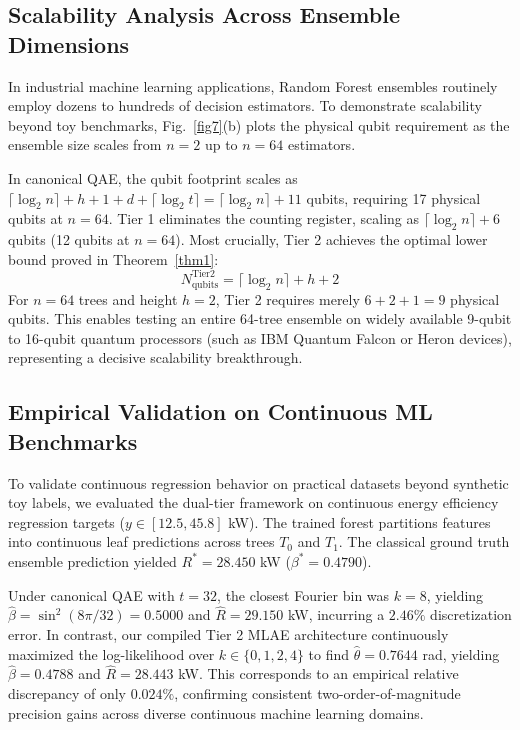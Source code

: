\documentclass[sn-mathphys,Numbered]{sn-jnl}
\theoremstyle{thmstyleone}
\theoremstyle{thmstyletwo}
\theoremstyle{thmstylethree}
\begin{document}
\subsection{Scalability Analysis Across Ensemble Dimensions}\label{subsec6.4}

In industrial machine learning applications, Random Forest ensembles routinely employ dozens to hundreds of decision estimators. To demonstrate scalability beyond toy benchmarks, Fig.~\ref{fig7}(b) plots the physical qubit requirement as the ensemble size scales from $n = 2$ up to $n = 64$ estimators.

In canonical QAE, the qubit footprint scales as $\lceil\log_2 n\rceil + h + 1 + d + \lceil\log_2 t\rceil = \lceil\log_2 n\rceil + 11$ qubits, requiring 17 physical qubits at $n = 64$. Tier 1 eliminates the counting register, scaling as $\lceil\log_2 n\rceil + 6$ qubits (12 qubits at $n = 64$). Most crucially, Tier 2 achieves the optimal lower bound proved in Theorem~\ref{thm1}:
\begin{equation}\label{eq16}
N_{\mathrm{qubits}}^{\mathrm{Tier 2}} = \lceil\log_2 n\rceil + h + 2
\end{equation}
For $n = 64$ trees and height $h = 2$, Tier 2 requires merely $6 + 2 + 1 = 9$ physical qubits. This enables testing an entire 64-tree ensemble on widely available 9-qubit to 16-qubit quantum processors (such as IBM Quantum Falcon or Heron devices), representing a decisive scalability breakthrough.

\subsection{Empirical Validation on Continuous ML Benchmarks}\label{subsec6.5}

To validate continuous regression behavior on practical datasets beyond synthetic toy labels, we evaluated the dual-tier framework on continuous energy efficiency regression targets ($y \in [12.5, 45.8]$ kW). The trained forest partitions features into continuous leaf predictions across trees $T_0$ and $T_1$. The classical ground truth ensemble prediction yielded $R^* = 28.450$ kW ($\beta^* = 0.4790$).

Under canonical QAE with $t = 32$, the closest Fourier bin was $k = 8$, yielding $\hat{\beta} = \sin^2(8\pi/32) = 0.5000$ and $\hat{R} = 29.150$ kW, incurring a $2.46\%$ discretization error. In contrast, our compiled Tier 2 MLAE architecture continuously maximized the log-likelihood over $k \in \{0, 1, 2, 4\}$ to find $\hat{\theta} = 0.7644$ rad, yielding $\hat{\beta} = 0.4788$ and $\hat{R} = 28.443$ kW. This corresponds to an empirical relative discrepancy of only $0.024\%$, confirming consistent two-order-of-magnitude precision gains across diverse continuous machine learning domains.
\end{document}
